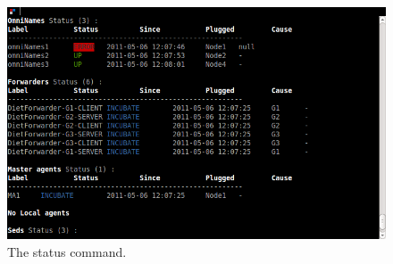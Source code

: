 \begin{figure}[h]
  \centering
  \includegraphics[width=12cm]{fig/6-StatusWithErrUpIncubate}
  \caption{The status command.\label{fig:GODIETStatus}}
\end{figure}

